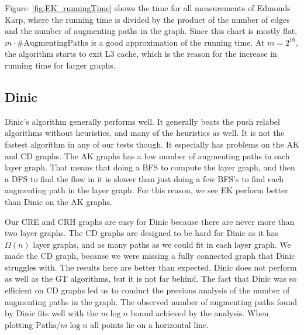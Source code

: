 Figure~\ref{fig:EK_runningTime} shows the time for all measurements of Edmonds Karp, where the running time is divided by the product of the number of edges and the number of augmenting paths in the graph.
Since this chart is mostly flat, $m \cdot \text{\#AugmentingPaths}$ is a good approximation of the running time.
At $m=2^{16}$, the algorithm starts to exit L3 cache, which is the reason for the increase in running time for larger graphs.


\subsection{Dinic}

Dinic's algorithm generally performs well.
It generally beats the push relabel algorithms without heuristics, and many of the heuristics as well. It is not the fastest algorithm in any of our tests though.
It especially has problems on the AK and CD graphs. 
The AK graphs has a low number of augmenting paths in each layer graph. That means that doing a BFS to compute the layer graph, and then a DFS to find the flow in it is slower than just doing a few BFS's to find each augmenting path in the layer graph.
For this reason, we see EK perform better than Dinic on the AK graphs.

Our CRE and CRH graphs are easy for Dinic because there are never more than two layer graphs.
The CD graphs are designed to be hard for Dinic as it has $\Omega(n)$ layer graphs, and as many paths as we could fit in each layer graph. 
We made the CD graph, because we were missing a fully connected graph that Dinic struggles with. 
The results here are better than expected. Dinic does not perform as well as the GT algorithms, but it is not far behind.
The fact that Dinic was so efficient on CD graphs led us to conduct the previous analysis of the number of augmenting paths in the graph.
The observed number of augmenting paths found by Dinic fits well with the $m \log n$ bound achieved by the analysis.
When plotting $\mathrm{Paths}/m\log n$ all points lie on a horizontal line.



